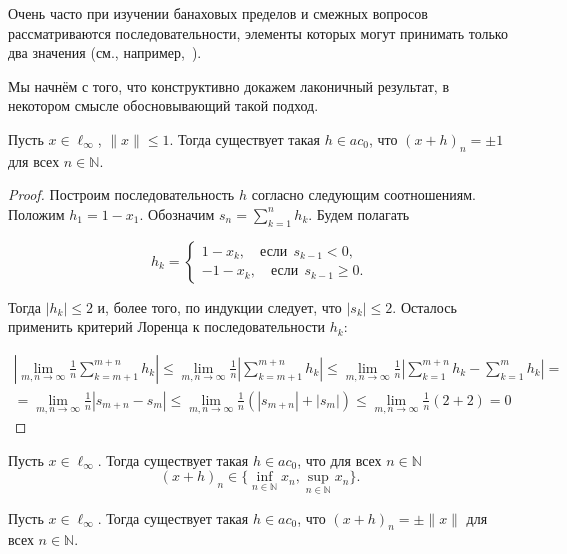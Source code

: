 Очень часто при изучении банаховых пределов и смежных вопросов
рассматриваются последовательности,
элементы которых могут принимать только два значения
(см., например,~\cite{connor1990almost,our-mz2019ac0,avdeev2021vestnik,avdeev2021vmzprimes}).


Мы начнём с того,
что конструктивно докажем лаконичный результат,
в некотором смысле обосновывающий такой подход.


\begin{lemma}
	Пусть $x\in\ell_\infty$, $\|x\|\leq 1$.
	Тогда существует такая $h\in ac_0$, что $(x+h)_n = \pm 1$ для всех $n\in\mathbb N$.
\end{lemma}

\begin{proof}
	Построим последовательность $h$ согласно следующим соотношениям.
	Положим $h_1 = 1-x_1$.
	Обозначим $s_n = \sum_{k=1}^n h_k$. Будем полагать

	$$
		h_k = \begin{cases}
			1-x_k, \quad\mbox{если}~~ s_{k-1} < 0,
			\\
			-1 - x_k,\quad\mbox{если}~~ s_{k-1} \geq 0
			.
		\end{cases}
	$$

	Тогда $|h_k| \leq 2$ и, более того, по индукции следует, что $|s_k| \leq 2$. Осталось применить критерий Лоренца к последовательности $h_k$:

	\begin{multline*}
		\left|\lim_{m,n\to \infty} \frac{1}{n} \sum_{k=m+1}^{m+n} h_k\right| \leq
		\lim_{m,n\to \infty} \frac{1}{n} \left|\sum_{k=m+1}^{m+n} h_k\right| \leq
		\lim_{m,n\to \infty} \frac{1}{n} \left|\sum_{k=1}^{m+n} h_k - \sum_{k=1}^{m} h_k  \right| =
		\\=
		\lim_{m,n\to \infty} \frac{1}{n} \left|s_{m+n} - s_{m}  \right| \leq
		\lim_{m,n\to \infty} \frac{1}{n} (|s_{m+n}| + |s_{m} |) \leq
		\lim_{m,n\to \infty} \frac{1}{n} (2 + 2) =0
	\end{multline*}
\end{proof}

\begin{corollary}
	Пусть $x\in\ell_\infty$.
	Тогда существует такая $h\in ac_0$, что для всех $n\in\mathbb N$
	\begin{equation*}
		(x+h)_n \in \{\inf_{n\in\mathbb N} x_n,\sup_{n\in\mathbb N} x_n\}
		.
	\end{equation*}
\end{corollary}


\begin{corollary}
	Пусть $x\in\ell_\infty$.
	Тогда существует такая $h\in ac_0$, что $(x+h)_n =\pm \|x\|$ для всех $n\in\mathbb N$.
\end{corollary}

